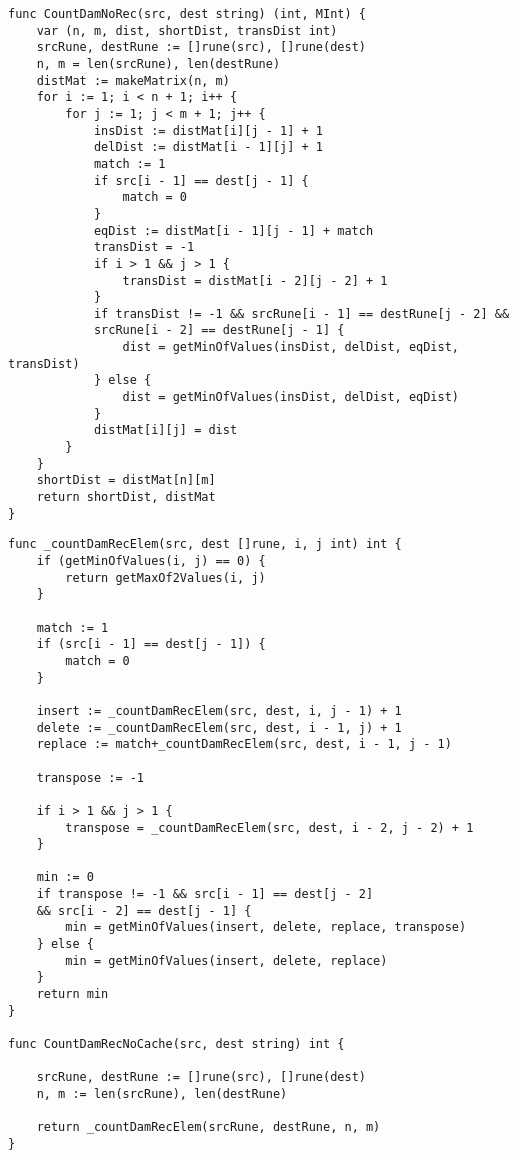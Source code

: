 \begin{lstlisting}[label=leven-recursive,caption=Программный код нахождения расстояния Дамерау\,--\,Левенштейна итеративно]
func CountDamNoRec(src, dest string) (int, MInt) {
	var (n, m, dist, shortDist, transDist int)
	srcRune, destRune := []rune(src), []rune(dest)
	n, m = len(srcRune), len(destRune)
	distMat := makeMatrix(n, m)
	for i := 1; i < n + 1; i++ {
		for j := 1; j < m + 1; j++ {
			insDist := distMat[i][j - 1] + 1
			delDist := distMat[i - 1][j] + 1
			match := 1
			if src[i - 1] == dest[j - 1] {
				match = 0
			}
			eqDist := distMat[i - 1][j - 1] + match
			transDist = -1
			if i > 1 && j > 1 {
				transDist = distMat[i - 2][j - 2] + 1
			}
			if transDist != -1 && srcRune[i - 1] == destRune[j - 2] && 
			srcRune[i - 2] == destRune[j - 1] {
				dist = getMinOfValues(insDist, delDist, eqDist, transDist)
			} else {
				dist = getMinOfValues(insDist, delDist, eqDist)
			}
			distMat[i][j] = dist
		}
	}
	shortDist = distMat[n][m]
	return shortDist, distMat
}
\end{lstlisting}

\begin{lstlisting}[label=damer-lev-iter,caption=Программный код нахождения расстояния Дамерау\,--\,Левенштейна рекурсивно]
func _countDamRecElem(src, dest []rune, i, j int) int {
	if (getMinOfValues(i, j) == 0) {
		return getMaxOf2Values(i, j)
	}
	
	match := 1
	if (src[i - 1] == dest[j - 1]) {
		match = 0
	}
	
	insert := _countDamRecElem(src, dest, i, j - 1) + 1
	delete := _countDamRecElem(src, dest, i - 1, j) + 1
	replace := match+_countDamRecElem(src, dest, i - 1, j - 1)
	
	transpose := -1
	
	if i > 1 && j > 1 {
		transpose = _countDamRecElem(src, dest, i - 2, j - 2) + 1
	}
	
	min := 0
	if transpose != -1 && src[i - 1] == dest[j - 2] 
	&& src[i - 2] == dest[j - 1] {
		min = getMinOfValues(insert, delete, replace, transpose)
	} else {
		min = getMinOfValues(insert, delete, replace)
	}
	return min
}

func CountDamRecNoCache(src, dest string) int {
	
	srcRune, destRune := []rune(src), []rune(dest)
	n, m := len(srcRune), len(destRune)
	
	return _countDamRecElem(srcRune, destRune, n, m)
}
\end{lstlisting}

